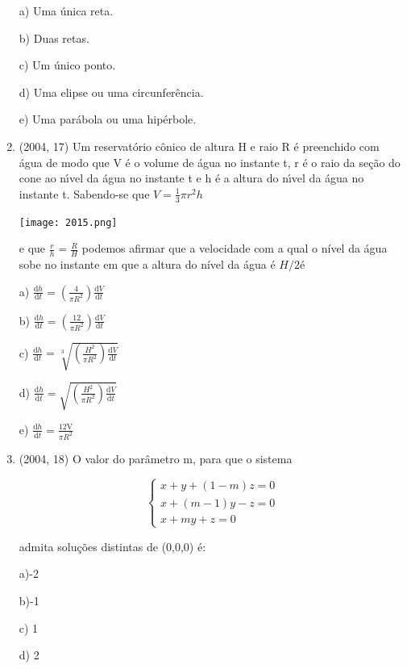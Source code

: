 \documentclass{article}
\begin{document}
\begin{enumerate}
a) Uma única reta.

b) Duas retas.

c) Um único ponto.

d) Uma elipse ou uma circunferência.

e) Uma parábola ou uma hipérbole.\newline




\item(2004, 17) Um reservatório cônico de altura H e raio R é preenchido com água de modo que V é o volume de água no instante t, r é o raio da seção do cone ao nı́vel da água no instante t e h é a altura do nı́vel da água no instante t. Sabendo-se que $V=\frac{1}{3} \pi r^{2} h$

\texttt{[image: 2015.png]}\newline

e que $\frac{r}{h}=\frac{R}{H}$ podemos afirmar que a velocidade com a qual o nível da água sobe no
instante em que a altura do nível da água é $H / 2 é$

a) $\frac{\mathrm{d} h}{\mathrm{d} t}=\left(\frac{4}{\pi R^{2}}\right) \frac{\mathrm{d} V}{\mathrm{d} t}$

b) $\frac{\mathrm{d} h}{\mathrm{d} t}=\left(\frac{12}{\pi R^{2}}\right) \frac{\mathrm{d} V}{\mathrm{d} t}$

c) $\frac{\mathrm{d} h}{\mathrm{d} t}=\sqrt[3]{\left(\frac{H^{2}}{\pi R^{2}}\right) \frac{\mathrm{d} V}{\mathrm{d} t}}$

d) $\frac{\mathrm{d} h}{\mathrm{d} t}=\sqrt{\left(\frac{H^{2}}{\pi R^{2}}\right) \frac{\mathrm{d} V}{\mathrm{d} t}}$

e) $\frac{\mathrm{d} h}{\mathrm{d} t}=\frac{12 \mathrm{V}}{\pi R^{2}}$ \newline



\item(2004, 18) O valor do parâmetro m, para que o sistema

$$\left\{\begin{array}{l}{x+y+(1-m) z=0} \\ {x+(m-1) y-z=0} \\ {x+m y+z=0}\end{array}\right.$$

admita soluções distintas de (0,0,0) é:

a)-2

b)-1

c) 1

d) 2


\end{enumerate}
\end{document}
